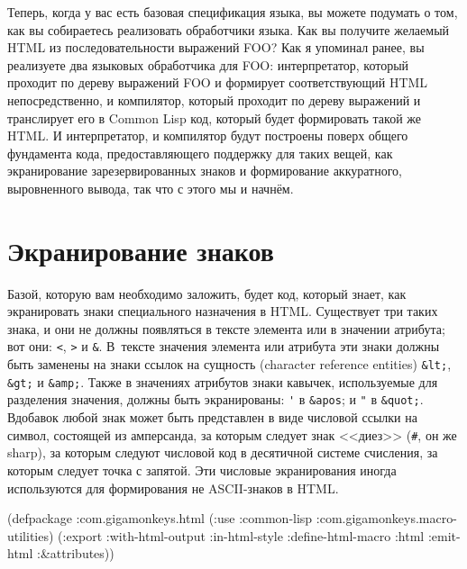 Теперь, когда у вас есть базовая спецификация языка, вы можете подумать о том, как вы
собираетесь реализовать обработчики языка. Как вы получите желаемый HTML из
последовательности выражений FOO? Как я упоминал ранее, вы реализуете два языковых
обработчика для FOO: интерпретатор, который проходит по дереву выражений FOO и формирует
соответствующий HTML непосредственно, и компилятор, который проходит по дереву выражений и
транслирует его в Common Lisp код, который будет формировать такой же HTML. И
интерпретатор, и компилятор будут построены поверх общего фундамента кода, предоставляющего
поддержку для таких вещей, как экранирование зарезервированных знаков и формирование
аккуратного, выровненного вывода, так что с этого мы и начнём.

\section{Экранирование знаков}

Базой, которую вам необходимо заложить, будет код, который знает, как экранировать знаки
специального назначения в HTML. Существует три таких знака, и они не должны появляться в
тексте элемента или в значении атрибута; вот они: \lstinline{<}, \lstinline{>} и
\lstinline!&!. В~тексте значения элемента или атрибута эти знаки должны быть заменены на
знаки ссылок на сущность (character reference entities) \lstinline!&lt;!, \lstinline!&gt;!
и \lstinline!&amp;!. Также в значениях атрибутов знаки кавычек, используемые для
разделения значения, должны быть экранированы: \lstinline!'! в \lstinline!&apos!; и
\lstinline!"! в \lstinline!&quot;!. Вдобавок любой знак может быть представлен в виде
числовой ссылки на символ, состоящей из амперсанда, за которым следует знак <<диез>>
(\lstinline!#!, он же sharp), за которым следуют числовой код в десятичной системе
счисления, за которым следует точка с запятой. Эти числовые экранирования иногда
используются для формирования не ASCII-знаков в HTML.

\vspace{0.8cm}

\begin{lrbox}{\chthreezeroone}
  \begin{minipage}{\linewidth}
\begin{myverb}
(defpackage :com.gigamonkeys.html
  (:use :common-lisp :com.gigamonkeys.macro-utilities)
  (:export :with-html-output
           :in-html-style
           :define-html-macro
           :html
           :emit-html
           :\&attributes))
\end{myverb}
  \end{minipage}
\end{lrbox}


